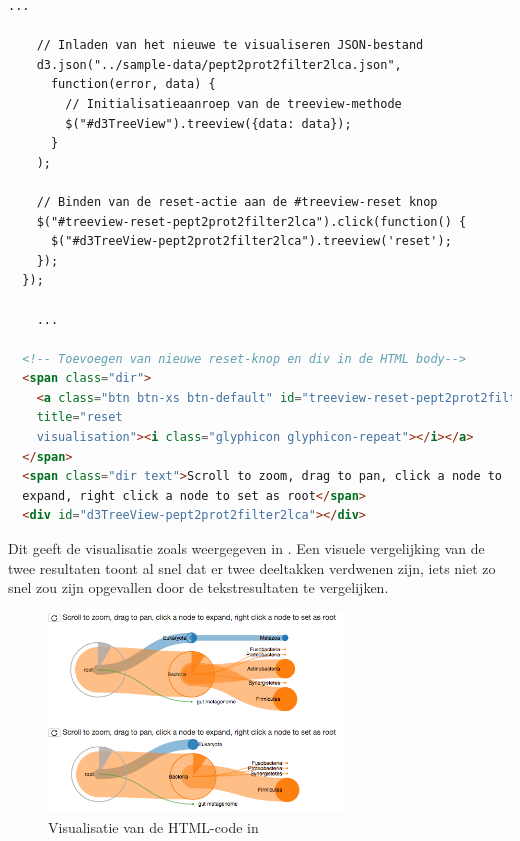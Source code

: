\begin{lstlisting}[language=HTML,caption={Uitbreiding van  
\Cref{lst:visexample1} waarbij een tweede treeview is toegevoegd}, 
label={lst:visexample2}, float]
    ...
        
    // Inladen van het nieuwe te visualiseren JSON-bestand
    d3.json("../sample-data/pept2prot2filter2lca.json", 
      function(error, data) {
        // Initialisatieaanroep van de treeview-methode
        $("#d3TreeView").treeview({data: data});
      }
    );
    
    // Binden van de reset-actie aan de #treeview-reset knop
    $("#treeview-reset-pept2prot2filter2lca").click(function() {
      $("#d3TreeView-pept2prot2filter2lca").treeview('reset');
    });
  });
 
    ...

  <!-- Toevoegen van nieuwe reset-knop en div in de HTML body-->
  <span class="dir">
    <a class="btn btn-xs btn-default" id="treeview-reset-pept2prot2filter2lca" 
    title="reset 
    visualisation"><i class="glyphicon glyphicon-repeat"></i></a>
  </span>
  <span class="dir text">Scroll to zoom, drag to pan, click a node to 
  expand, right click a node to set as root</span>
  <div id="d3TreeView-pept2prot2filter2lca"></div>
\end{lstlisting}

Dit geeft de visualisatie zoals weergegeven in . Een 
visuele vergelijking van de twee resultaten toont al snel dat er twee 
deeltakken verdwenen zijn, iets niet zo snel zou zijn opgevallen door de 
tekstresultaten te vergelijken.

\begin{figure}
    \centering
    \includegraphics[width=0.7\textwidth]{includes/visexample2}
    \caption{Visualisatie van de HTML-code in }
    \label{fig:visexample2}
\end{figure}

